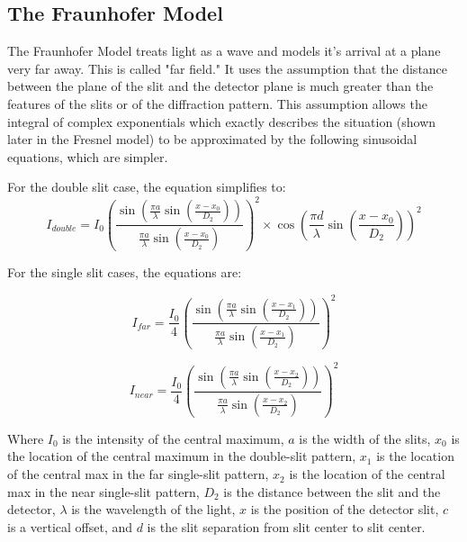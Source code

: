\documentclass[prb,preprint]{revtex4-1}
\begin{document}
\subsection{The Fraunhofer Model}

The Fraunhofer Model treats light as a wave and models it's arrival at a plane very far away. This is called "far field." It uses the assumption that the distance between the plane of the slit and the detector plane is much greater than the features of the slits or of the diffraction pattern.  This assumption allows the integral of complex exponentials which exactly describes the situation (shown later in the Fresnel model) to be approximated by the following sinusoidal equations, which are simpler. ~\cite{wolfram}

For the double slit case, the equation simplifies to:
\begin{equation}
I_{double}= I_{0}(\frac{\sin(\frac{\pi a}{\lambda}\sin(\frac{x-x_{0}}{D_{2}}))}{\frac{\pi a}{\lambda}\sin(\frac{x-x_{0}}{D_{2}})})^{2} \times \cos(\frac{\pi d}{\lambda}\sin(\frac{x-x_{0}}{D_{2}}))^{2}
\end{equation}

For the single slit cases, the equations are: 

\begin{equation}
I_{far}= \frac{I_{0}}{4}(\frac{\sin(\frac{\pi a}{\lambda}\sin(\frac{x-x_{1}}{D_{2}}))}{\frac{\pi a}{\lambda}\sin(\frac{x-x_{1}}{D_{2}})})^{2} 
\end{equation}

\begin{equation}
I_{near}= \frac{I_{0}}{4}(\frac{\sin(\frac{\pi a}{\lambda}\sin(\frac{x-x_{2}}{D_{2}}))}{\frac{\pi a}{\lambda}\sin(\frac{x-x_{2}}{D_{2}})})^{2} 
\end{equation}

Where $I_0$ is the intensity of the central maximum, $a$ is the width of the slits, $x_0$ is the location of the central maximum in the double-slit pattern, $x_1$ is the location of the central max in the far single-slit pattern, $x_2$ is the location of the central max in the near single-slit pattern, $D_2$ is the distance between the slit and the detector, $\lambda$ is the wavelength of the light, $x$ is the position of the detector slit, $c$ is a vertical offset, and $d$ is the slit separation from slit center to slit center. 
\end{document}
